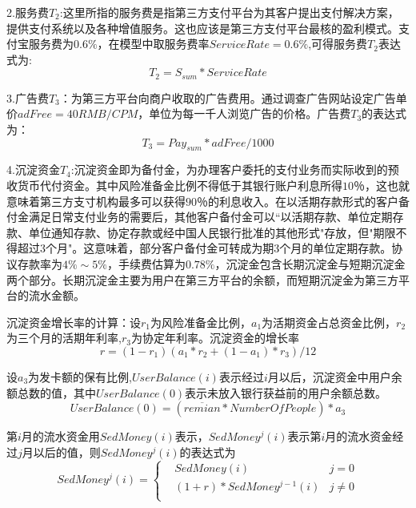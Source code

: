 \documentclass[withoutpreface,bwprint]{cumcmthesis} %
\begin{document}
2.服务费$T_2$:这里所指的服务费是指第三方支付平台为其客户提出支付解决方案，提供支付系统以及各种增值服务。这也应该是第三方支付平台最核的盈利模式。支付宝服务费为$0.6\%$，在模型中取服务费率$ServiceRate=​0.6\%$,可得服务费$T_2$表达式为:
\begin{equation}
T_2=S_{sum}*ServiceRate
\end{equation}

3.广告费$T_3$：为第三方平台向商户收取的广告费用。通过调查广告网站设定广告单价$adFree=40RMB/CPM$，单位为每一千人浏览广告的价格。广告费$T_3$的表达式为：
\begin{equation}
T_3=Pay_{sum}*adFree/1000
\end{equation}

4.沉淀资金$T_4$:沉淀资金即为备付金，为办理客户委托的支付业务而实际收到的预收货币代付资金。其中风险准备金比例不得低于其银行账户利息所得$10$％，这也就意味着第三方支寸机构最多可以获得$90$％的利息收入。在以活期存款形式的客户备付金满足日常支付业务的需要后，其他客户备付金可以“以活期存款、单位定期存款、单位通知存款、协定存款或经中国人民银行批准的其他形式"存放，但"期限不得超过3个月"。这意味着，部分客户备付金可转成为期3个月的单位定期存款。协议存款率为$4\%\sim5\%$，手续费估算为$0.78\%$，沉淀金包含长期沉淀金与短期沉淀金两个部分。长期沉淀金主要为用户在第三方平台的余额，而短期沉淀金为第三方平台的流水金额。

沉淀资金增长率的计算：设$r_1$为风险准备金比例，$a_1$为活期资金占总资金比例，$r_2$为三个月的活期年利率,$r_3$为协定年利率。沉淀资金的增长率
\begin{equation}
r=(1-r_1)(a_1*r_2+(1-a_1)*r_3)/12
\end{equation}

设$a_3$为发卡额的保有比例,$UserBalance(i)$表示经过$i$月以后，沉淀资金中用户余额总数的值，其中$UserBalance(0)$表示未放入银行获益前的用户余额总数。
\begin{equation}
UserBalance(0)=(\overline {remian} * {NumberOfPeople})*a_3
\end{equation}

第$i$月的流水资金用$SedMoney(i)$表示，$SedMoney^j(i)$表示第$i$月的流水资金经过$j$月以后的值，则$SedMoney^j(i)$的表达式为
\begin{equation}
SedMoney^j(i)=\left\{
\begin{aligned}
&SedMoney(i)  & j=0\\
&(1+r)*SedMoney^{j-1}(i)  & j\neq0\\
\end{aligned}
\right.
\end{equation}
\end{document}
